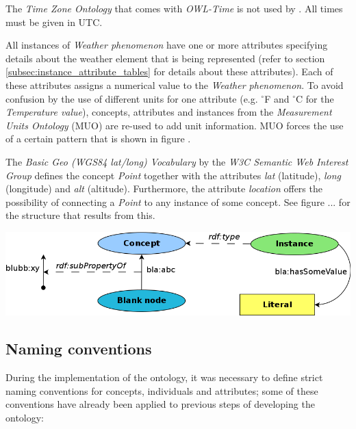 The \emph{Time Zone Ontology} that comes with \emph{OWL-Time} is not used by \thinkhomeweather. All times must be given in UTC.

All instances of \emph{Weather phenomenon} have one or more attributes specifying details about the weather element that is being represented (refer to section \ref{subsec:instance_attribute_tables} for details about these attributes). Each of these attributes assigns a numerical value to the \emph{Weather phenomenon}. To avoid confusion by the use of different units for one attribute (e.g. $^\circ$F and $^\circ$C for the \emph{Temperature value}), concepts, attributes and instances from the \emph{Measurement Units Ontology} (MUO) are re-used to add unit information. MUO forces the use of a certain pattern that is shown in figure . %

The \emph{Basic Geo (WGS84 lat/long) Vocabulary} by the \emph{W3C Semantic Web Interest Group} defines the concept \emph{Point} together with the attributes \emph{lat} (latitude), \emph{long} (longitude) and \emph{alt} (altitude). Furthermore, the attribute \emph{location} offers the possibility of connecting a \emph{Point} to any instance of some concept. See figure ... for the structure that results from this. %

\begin{center}
  \includegraphics[width=\textwidth]{figures/diagrams/template.png}
\end{center}


\subsection{Naming conventions}

During the implementation of the \thinkhomeweather ontology, it was necessary to define strict naming conventions for concepts, individuals and attributes; some of these conventions have already been applied to previous steps of developing the ontology:

